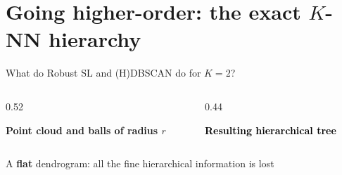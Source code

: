 \documentclass[A4,svgnames,9pt,aspectratio=169]{beamer}
\begin{document}
\section{\texorpdfstring{Going \textcolor{inria-rouge}{higher-order}: the exact $K$-NN hierarchy}{Going higher-order: the exact K-NN hierarchy}}
\frame{\sectionpage}

\begin{frame}{What do Robust SL and (H)DBSCAN do for $K = 2$?}
    \begin{columns}[c, onlytextwidth]
        \begin{column}{0.52\textwidth}
            \begin{center}
                \textbf{Point cloud and balls of radius $r$}

                \vspace{0.4cm}
                
            \end{center}
        \end{column}

        \begin{column}{0.44\textwidth}
            \begin{center}
                \textcolor{black}{\textbf{Resulting hierarchical tree}}

                \vspace{0.4cm}
                
            \end{center}
        \end{column}
    \end{columns}
    \vspace{0.3cm}
    \begin{center}
        \small A \textbf{flat} dendrogram: all the fine hierarchical information is lost
    \end{center}
\end{frame}
\end{document}
